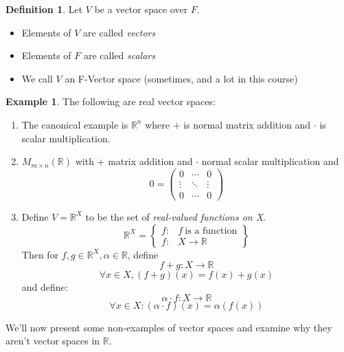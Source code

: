 \documentclass{report}
\theoremstyle{remark}
\theoremstyle{definition}
\newtheorem{definition}[theorem]{Definition}
\theoremstyle{definition}
\newtheorem{example}[theorem]{Example}
\theoremstyle{theorem}
\begin{document}
\begin{definition}
Let $V$ be a vector space over $F$.
\begin{itemize}
    \item Elements of $V$ are called \emph{vectors}
    \item Elements of $F$ are called \emph{scalars}
    \item We call $V$ an F-Vector space (sometimes, and a lot in this course)
\end{itemize}
\end{definition}
\begin{example}
The following are real vector spaces:
\begin{enumerate}
    \item The canonical example is $\mathbb{R}^n$ where $+$ is normal matrix addition and $\cdot$ is scalar multiplication.
    \item $M_{m \times n}(\mathbb{R})$ with + matrix addition and $\cdot$ normal scalar multiplication and
    \[0 = \begin{pmatrix}
    0&\cdots&0\\
    \vdots&\ddots&\vdots\\
    0&\cdots&0
    \end{pmatrix} \]
    \item Define $V=\mathbb{R}^X$ to be the set of \emph{real-valued functions on X}. 
    \[\mathbb{R}^X = \left\{ \begin{array}{cc}
    f :& f \> \text{is a function}\\
    f :& X \rightarrow \mathbb{R} \end{array}
    \right\} \]
    Then for $f,g \in \mathbb{R}^X, \alpha \in \mathbb{R}$, define
    \[ f + g: X \rightarrow \mathbb{R} \]
    \[ \forall x \in X, (f + g)(x) = f(x) + g(x) \]
    and define:
    \[ \alpha \cdot f: X \rightarrow \mathbb{R} \]
    \[\forall x \in X: (\alpha \cdot f)(x) = \alpha(f(x)) \]
\end{enumerate}
\end{example}
We'll now present some non-examples of vector spaces and examine why they aren't vector spaces in $\mathbb{R}$.
\end{document}
